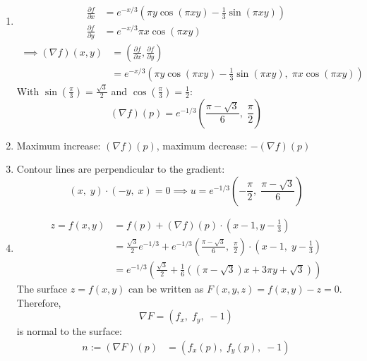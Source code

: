 \documentclass[11pt]{article}
\begin{document}
\begin{solution}
	\begin{enumerate}
		\item
		      $$
			      \begin{aligned}
				      \frac{\partial f}{\partial x} & = e^{-x/3} \left( \pi y \cos(\pi xy) - \frac{1}{3} \sin(\pi xy) \right) \\
				      \frac{\partial f}{\partial y} & = e^{-x/3} \pi x \cos(\pi xy)
			      \end{aligned}
		      $$
		      $$
			      \begin{aligned}
				      \implies (\nabla f)(x,y) & = \left( \frac{\partial f}{\partial x}, \frac{\partial f}{\partial y} \right)                  \\
				                               & = e^{-x/3} \left( \pi y \cos(\pi xy) - \frac{1}{3} \sin(\pi xy), \; \pi x \cos(\pi xy) \right)
			      \end{aligned}
		      $$
		      With $\sin(\frac{\pi}{3}) = \frac{\sqrt{3}}{2}$ and $\cos(\frac{\pi}{3}) = \frac{1}{2}$:
		      $$
			      (\nabla f)(p) = e^{-1/3} \left( \frac{\pi - \sqrt{3}}{6}, \; \frac{\pi}{2} \right)
		      $$
		\item
		      Maximum increase: $(\nabla f)(p)$, maximum decrease: $-(\nabla f)(p)$
		\item
		      Contour lines are perpendicular to the gradient:
		      $$
			      (x, \; y) \cdot (-y, \; x) = 0 \implies u = e^{-1/3} \left( - \frac{\pi}{2}, \; \frac{\pi - \sqrt{3}}{6} \right)
		      $$
		\item
		      $$
			      \begin{aligned}
				      z = f(x, y) & = f(p) + (\nabla f)(p) \cdot (x - 1, y - \frac{1}{3})                                                                                \\
				                  & = \frac{\sqrt{3}}{2} e^{-1/3} + e^{-1/3} \left( \frac{\pi - \sqrt{3}}{6}, \; \frac{\pi}{2} \right) \cdot (x - 1, \; y - \frac{1}{3}) \\
				                  & = e^{-1/3} \left( \frac{\sqrt{3}}{2} + \frac{1}{6} \left( (\pi - \sqrt{3}) x + 3 \pi y + \sqrt{3} \right) \right)
			      \end{aligned}
		      $$
		      The surface $z = f(x, y)$ can be written as $F(x, y, z) = f(x, y) - z = 0$. Therefore,
		      $$
			      \nabla F = (f_x, \; f_y, \; -1)
		      $$
		      is normal to the surface:
		      $$
			      \begin{aligned}
				      n := (\nabla F)(p) & = \left( f_x(p), \; f_y(p), \; -1\right)                                            \\

\end{aligned}$$
\end{enumerate}
\end{solution}
\end{document}
